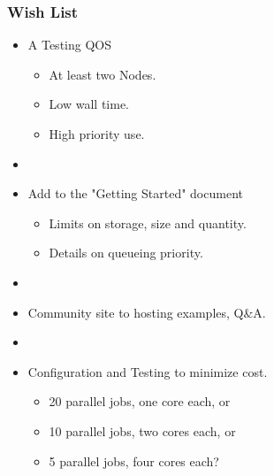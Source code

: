 \documentclass[10pt]{beamer}
\begin{document}
\begin{frame}
  \frametitle{Wish List}
  \begin{itemize}
    \item A Testing QOS
      \begin{itemize}
        \item At least two Nodes.
        \item Low wall time.
        \item High priority use.
      \end{itemize}
    \item[]
    \item Add to the "Getting Started" document
      \begin{itemize}
        \item Limits on storage, size and quantity.
        \item Details on queueing priority.
      \end{itemize}
    \item[]
    \item Community site to hosting examples, Q\&A.
    \item[]
    \item Configuration and Testing to minimize cost.
      \begin{itemize}
        \item 20 parallel jobs, one core each, or
        \item 10 parallel jobs, two cores each, or
        \item 5 parallel jobs, four cores each?
      \end{itemize}
  \end{itemize}
\end{frame}
\end{document}
